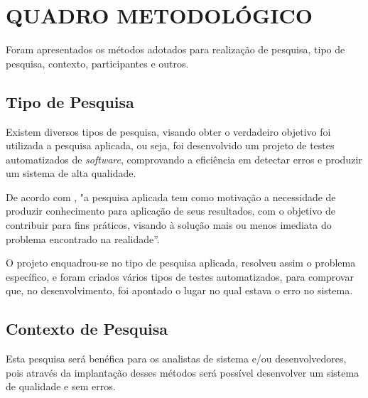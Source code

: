 
\chapter{QUADRO METODOLÓGICO}

\par Foram apresentados os métodos adotados para realização de pesquisa,  tipo de pesquisa, contexto, participantes e outros.

\section{Tipo de Pesquisa}

    
\par Existem diversos tipos de pesquisa, visando obter o verdadeiro objetivo foi utilizada a pesquisa aplicada, ou seja, foi desenvolvido um projeto de testes automatizados de \textit{software}, comprovando a eficiência em detectar erros e produzir um sistema de alta qualidade.

\par De acordo com , "a pesquisa aplicada tem como motivação a necessidade de produzir conhecimento para aplicação de seus resultados, com o objetivo de contribuir para fins práticos, visando à solução mais ou menos imediata do problema encontrado na realidade”.

\par O projeto enquadrou-se no tipo de pesquisa aplicada, resolveu assim o problema específico, e foram criados vários tipos de testes automatizados, para comprovar que, no desenvolvimento, foi apontado o lugar no qual estava o erro no sistema.

\section{Contexto de Pesquisa}

\par Esta pesquisa será benéfica para os analistas de sistema e/ou desenvolvedores, pois através da implantação desses métodos será possível desenvolver um sistema de qualidade e sem erros.

